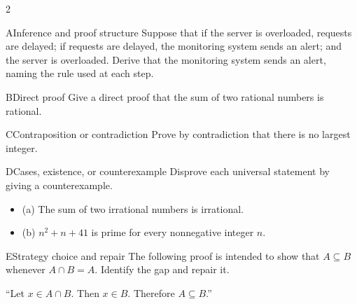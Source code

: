 \documentclass[9pt]{extarticle}
\begin{document}
\begin{multicols}{2}
\begin{CoreProblem}{A}{Inference and proof structure}
Suppose that if the server is overloaded, requests are delayed; if requests are
delayed, the monitoring system sends an alert; and the server is overloaded.
Derive that the monitoring system sends an alert, naming the rule used at each
step.
\end{CoreProblem}
\begin{CoreProblem}{B}{Direct proof}
Give a direct proof that the sum of two rational numbers is rational.
\end{CoreProblem}
\begin{CoreProblem}{C}{Contraposition or contradiction}
Prove by contradiction that there is no largest integer.
\end{CoreProblem}
\columnbreak
\begin{CoreProblem}{D}{Cases, existence, or counterexample}
Disprove each universal statement by giving a counterexample.
\begin{itemize}
  \item (a) The sum of two irrational numbers is irrational.
  \item (b) $n^2+n+41$ is prime for every nonnegative integer $n$.
\end{itemize}
\end{CoreProblem}
\begin{CoreProblem}{E}{Strategy choice and repair}
The following proof is intended to show that $A\subseteq B$ whenever
$A\cap B=A$. Identify the gap and repair it.

``Let $x\in A\cap B$. Then $x\in B$. Therefore $A\subseteq B$.''
\end{CoreProblem}
\end{multicols}
\CoreWorkArea
\FormBreak
{}
\end{document}
